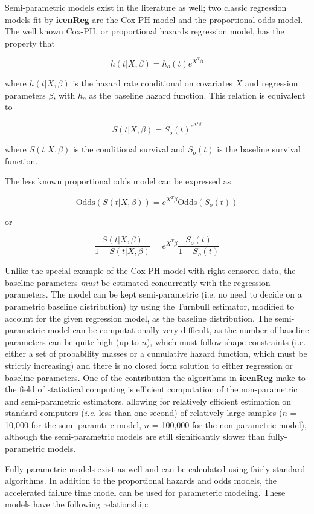 \documentclass[a4paper]{article}
\begin{document}
Semi-parametric models exist in the literature as well; two classic regression models fit by {\bf icenReg} are the Cox-PH model and the proportional odds model. The well known Cox-PH, or proportional hazards regression model, has the property that
  
\[ h(t | X, \beta) = h_o(t) e^{X^T \beta} \]
  
where $h(t | X, \beta)$ is the hazard rate conditional on covariates $X$ and regression parameters $\beta$, with $h_o$ as the baseline hazard function. This relation is equivalent to 

\[S(t | X, \beta) = S_o(t)^{e^{X^T \beta} } \]
  
where $S(t| X, \beta)$ is the conditional survival and $S_o(t)$ is the baseline survival function. 
  
The less known proportional odds model can be expressed as
  
\[\text{Odds}(S(t | X, \beta)) = e^{X^T \beta} \text{Odds}(S_o(t)) \]
\begin{center}  
  or
\end{center}
\[ \frac{S(t | X, \beta)} {1 - S(t | X, \beta) } = e^{X^T \beta}\frac{S_o(t)} {1 - S_o(t)} \]
  
  
Unlike the special example of the Cox PH model with right-censored data, the baseline parameters \emph{must} be estimated concurrently with the regression parameters. The model can be kept semi-parametric (i.e. no need to decide on a parametric baseline distribution) by using the Turnbull estimator, modified to account for the given regression model, as the baseline distribution. The semi-parametric model can be computationally very difficult, as the number of baseline parameters can be quite high (up to $n$), which must follow shape constraints (i.e. either a set of probability masses or a cumulative hazard function, which must be strictly increasing) and there is no closed form solution to either regression or baseline parameters. One of the contribution the algorithms in {\bf icenReg} make to the field of statistical computing is efficient computation of the non-parametric and semi-parametric estimators, allowing for relatively efficient estimation on standard computers (\emph{i.e.} less than one second) of relatively large samples ($n$ = 10,000 for the semi-paramtric model, $n$ = 100,000 for the non-parametric model), although the semi-parametric models are still significantly slower than fully-parametric models. 
  
  
Fully parametric models exist as well and can be calculated using fairly standard algorithms. In addition to the proportional hazards and odds models, the accelerated failure time  model can be used for parameteric modeling. These models have the following relationship:  
  
\end{document}
